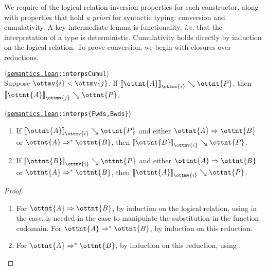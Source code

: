 \documentclass[a4paper,UKenglish,cleveref,autoref,thm-restate]{lipics-v2021}
\makeatletter
\newcommand{\repo}{https://github.com/ionathanch/TTBFL}
\newcommand{\ie}{\textit{i.e.}\@\xspace}
\newcommand{\apriori}{\textit{a priori}\@\xspace}
\newcommand{\thmref}[2]{%
  $\langle$\href{\repo/tree/main/src/#1}{\texttt{#1}}\texttt{:#2}$\rangle$%
}
\makeatother
\begin{document}
We require of the logical relation inversion properties for each constructor,
along with properties that hold \apriori for syntactic typing:
conversion and cumulativity.
A key intermediate lemma is functionality,
\ie that the interpretation of a type is deterministic.
Cumulativity holds directly by induction on the logical relation.
To prove conversion, we begin with closures over reductions.

\begin{lemma}[Cumulativity (l.r.)] \thmref{semantics.lean}{interpsCumul} \label{lem:lr:cumul} \\
  Suppose $ \ottmv{i}  <  \ottmv{j} $. If $ \mathopen{\llbracket}  \ottnt{A}  \mathclose{\rrbracket}_{ \ottmv{i} } \searrow  \ottnt{P} $, then $ \mathopen{\llbracket}  \ottnt{A}  \mathclose{\rrbracket}_{ \ottmv{j} } \searrow  \ottnt{P} $.
\end{lemma}

\begin{lemma} \thmref{semantics.lean}{interps\{Fwds,Bwds\}} \label{lem:lr:pars} ~
  \begin{enumerate}[topsep=0pt]
    \item If $ \mathopen{\llbracket}  \ottnt{A}  \mathclose{\rrbracket}_{ \ottmv{i} } \searrow  \ottnt{P} $ and either $ \ottnt{A}  \Rightarrow  \ottnt{B} $ or $ \ottnt{A}  \Rightarrow^\ast  \ottnt{B} $,
      then $ \mathopen{\llbracket}  \ottnt{B}  \mathclose{\rrbracket}_{ \ottmv{i} } \searrow  \ottnt{P} $.
    \item If $ \mathopen{\llbracket}  \ottnt{B}  \mathclose{\rrbracket}_{ \ottmv{i} } \searrow  \ottnt{P} $ and either $ \ottnt{A}  \Rightarrow  \ottnt{B} $ or $ \ottnt{A}  \Rightarrow^\ast  \ottnt{B} $,
      then $ \mathopen{\llbracket}  \ottnt{A}  \mathclose{\rrbracket}_{ \ottmv{i} } \searrow  \ottnt{P} $.
  \end{enumerate}
\end{lemma}

\begin{proof} ~
  \begin{enumerate}[topsep=0pt]
    \item For $ \ottnt{A}  \Rightarrow  \ottnt{B} $, by induction on the logical relation,
      using  in the  case.
       is needed in the  case
      to manipulate the substitution in the function codomain.
      For $ \ottnt{A}  \Rightarrow^\ast  \ottnt{B} $, by induction on this reduction.
    \item For $ \ottnt{A}  \Rightarrow^\ast  \ottnt{B} $, by induction on this reduction,
      using . \qedhere
  \end{enumerate}
\end{proof}
\end{document}
